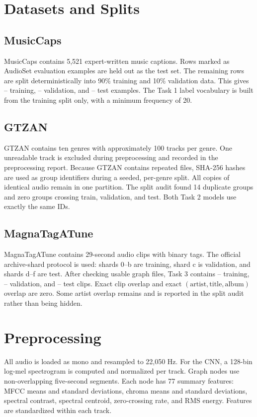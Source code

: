 \documentclass[conference]{IEEEtran}
\newcommand{\MusicCapsTrain}{--}
\newcommand{\MusicCapsValidation}{--}
\newcommand{\MusicCapsTest}{--}
\newcommand{\MTATTrain}{--}
\newcommand{\MTATValidation}{--}
\newcommand{\MTATTest}{--}
\begin{document}
\section{Datasets and Splits}
\subsection{MusicCaps}
MusicCaps contains 5,521 expert-written music captions. Rows marked as AudioSet evaluation
examples are held out as the test set. The remaining rows are split deterministically into
90\% training and 10\% validation data. This gives \MusicCapsTrain{} training,
\MusicCapsValidation{} validation, and \MusicCapsTest{} test examples. The Task 1 label
vocabulary is built from the training split only, with a minimum frequency of 20.

\subsection{GTZAN}
GTZAN contains ten genres with approximately 100 tracks per genre. One unreadable track is
excluded during preprocessing and recorded in the preprocessing report. Because GTZAN contains
repeated files, SHA-256 hashes are used as group identifiers during a seeded, per-genre split.
All copies of identical audio remain in one partition. The split audit found 14 duplicate groups
and zero groups crossing train, validation, and test. Both Task 2 models use exactly the same IDs.

\subsection{MagnaTagATune}
MagnaTagATune contains 29-second audio clips with binary tags. The official archive-shard
protocol is used: shards 0--b are training, shard c is validation, and shards d--f are test.
After checking usable graph files, Task 3 contains \MTATTrain{} training,
\MTATValidation{} validation, and \MTATTest{} test clips. Exact clip overlap and exact
$(\text{artist},\text{title},\text{album})$ overlap are zero. Some artist overlap remains and
is reported in the split audit rather than being hidden.

\section{Preprocessing}
All audio is loaded as mono and resampled to 22,050 Hz. For the CNN, a 128-bin log-mel
spectrogram is computed and normalized per track. Graph nodes use non-overlapping five-second
segments. Each node has 77 summary features: MFCC means and standard deviations, chroma means
and standard deviations, spectral contrast, spectral centroid, zero-crossing rate, and RMS
energy. Features are standardized within each track.
\end{document}
